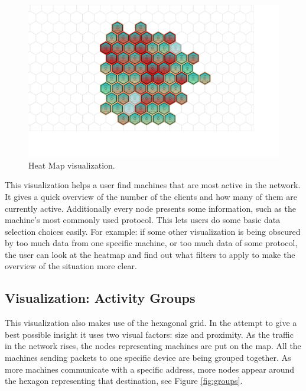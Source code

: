 \begin{figure}[htb]
   \centering
   \includegraphics[width=\linewidth]{materials/heat-map.jpg}
   \caption[Heat Map]{\label{fig:heatmap}
         Heat Map visualization.}
\end{figure}

This visualization helps a user find machines that are most active in the network.
It gives a quick overview of the number of the clients and how many of them are currently active.
Additionally every node presents some information, such as the machine's most commonly used protocol.
This lets users do some basic data selection choices easily. For example: if some other visualization
is being obscured by too much data from one specific machine, or too much data of some protocol,
the user can look at the heatmap and find out what filters to apply to make the overview of the
situation more clear.

\subsection{Visualization: Activity Groups}
%
This visualization also makes use of the hexagonal grid. In the attempt to give a best possible
insight it uses two visual factors: size and proximity. As the traffic in the network rises, the
nodes representing machines are put on the map. All the machines sending packets to one specific
device are being grouped together. As more machines communicate with a specific address, more nodes
appear around the hexagon representing that destination, see Figure \ref{fig:groups}.

